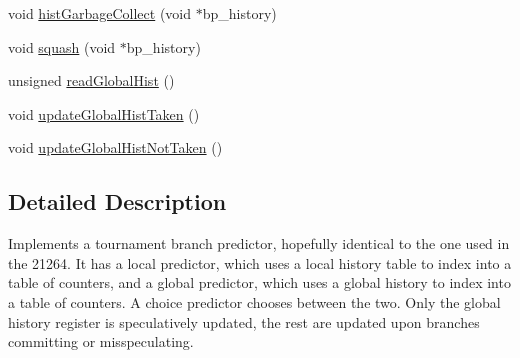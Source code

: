 \begin{DoxyCompactItemize}
void \hyperlink{classHybridBPskew_a4c3aa89615af200ad553461f20de8315}{histGarbageCollect} (void $\ast$bp\_\-history)
\item 
void \hyperlink{classHybridBPskew_a44db53115e8b3ccff2d9b7785c96f380}{squash} (void $\ast$bp\_\-history)
\item 
unsigned \hyperlink{classHybridBPskew_aa00b0494fe8fc804dd6ef9c1abf89c9d}{readGlobalHist} ()
\item 
void \hyperlink{classHybridBPskew_a9c1a201e37cbba10055ff63b9e072a69}{updateGlobalHistTaken} ()
\item 
void \hyperlink{classHybridBPskew_a07095043813d5f59978c0708efa58bd4}{updateGlobalHistNotTaken} ()
\end{DoxyCompactItemize}


\subsection{Detailed Description}
Implements a tournament branch predictor, hopefully identical to the one used in the 21264. It has a local predictor, which uses a local history table to index into a table of counters, and a global predictor, which uses a global history to index into a table of counters. A choice predictor chooses between the two. Only the global history register is speculatively updated, the rest are updated upon branches committing or misspeculating. 

